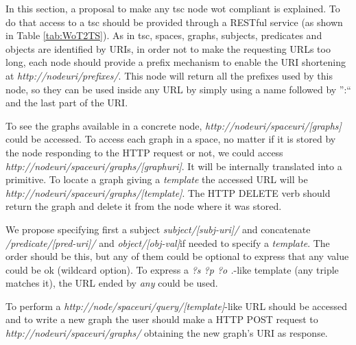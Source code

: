 In this section, a proposal to make any \ac{tsc} node \ac{wot} compliant is explained. To do that access to a \ac{tsc} should be provided through a RESTful service
(as shown in Table \ref{tab:WoT2TS}). As in \ac{tsc}, spaces, graphs, subjects, predicates and objects are identified by URIs, in order not to make the
requesting URLs too long, each node should provide a prefix mechanism to enable the URI shortening at \textit{http://nodeuri/prefixes/}.
This node will return all the prefixes used by this node, so they can be used inside any URL by simply using a name followed by '':`` and the last part of the URI.

To see the graphs available in a concrete node, \linebreak \textit{http://nodeuri/spaceuri/[graphs]} could be accessed. To access each graph
in a space, no matter if it is stored by the node responding to the HTTP request or not, we could access \textit{http://nodeuri/spaceuri/graphs/[graphuri]}.
It will be internally translated into a \primread primitive. To locate a graph giving a \textit{template} the accessed URL will be \linebreak
\textit{http://nodeuri/spaceuri/graphs/[template]}. The HTTP \linebreak DELETE verb should return the graph and delete it from the node where it was stored.

We propose specifying first a subject \textit{subject/[subj-uri]/} and concatenate \textit{/predicate/[pred-uri]/} and \textit{object/[obj-val]}\linebreak if needed to specify a \textit{template}. The order should be this, but any of them could be optional to express that any value could be ok (wildcard option). To express a \textit{?s ?p ?o .}-like template (any triple matches it), the URL ended by \textit{any} could be used.

To perform a \primquery \textit{http://node/spaceuri/query/[template]}-like URL should be accessed and to write a new graph the user should make a HTTP POST request to \linebreak \textit{http://nodeuri/spaceuri/graphs/} obtaining the new graph's URI as response.
